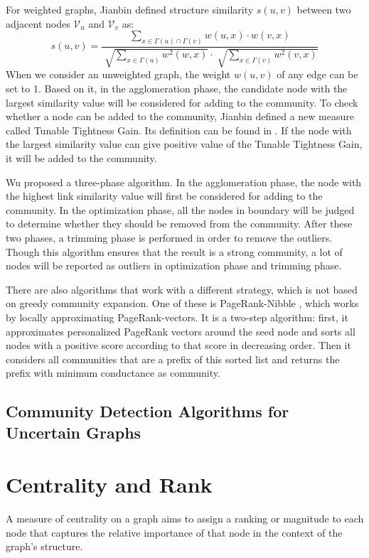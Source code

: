 \documentclass[\main/thesis.tex]{subfiles}
\begin{document}
For weighted graphs, Jianbin \cite{huang2011towards} defined structure similarity $s(u,v)$ between two adjacent nodes $\mathcal{V}_u$ and $\mathcal{V}_v$ as:
\begin{equation}
s(u,v)=\frac{\sum_{x\in \Gamma(u)\cap\Gamma(v)}w(u,x)\cdot w(v,x)}{\sqrt[]{\sum_{x\in \Gamma(u)}w^2(w,x)}\cdot\sqrt[]{\sum_{x\in \Gamma(v)}w^2(v,x)}}
\end{equation}
When we consider an unweighted graph, the weight $w(u,v)$ of any edge can be set to 1. Based on it, in the agglomeration phase, the candidate node with the largest similarity value will be considered for adding to the community. To check whether a node can be added to the community, Jianbin defined a new measure called Tunable Tightness Gain. Its definition can be found in \cite{huang2011towards}. If the node with the largest similarity value can give positive value of the Tunable Tightness Gain, it will be added to the community.

Wu \cite{wu2012local} proposed a three-phase algorithm. In the agglomeration phase, the node with the highest link similarity value will first be considered for adding to the community. In the optimization phase, all the nodes in boundary will be judged to determine whether they should be removed from the community. After these two phases, a trimming phase is performed in order to remove the outliers. Though this algorithm ensures that the result is a strong community, a lot of nodes will be reported as outliers in optimization phase and trimming phase.

There are also algorithms that work with a different strategy, which is not based on greedy community expansion. One of these is PageRank-Nibble \cite{andersen2006local}, which works by locally approximating PageRank-vectors. It is a two-step algorithm: first, it approximates personalized PageRank vectors around the seed node and sorts all nodes with a positive score according to that score in decreasing order. Then it considers all communities that are a prefix of this sorted list and returns the prefix with minimum conductance as community.

\subsection{Community Detection Algorithms for Uncertain Graphs}

\section{Centrality and Rank}
A measure of centrality on a graph aims to assign a ranking or magnitude to each node that captures the relative importance of that node in the context of the graph’s structure.
\end{document}
